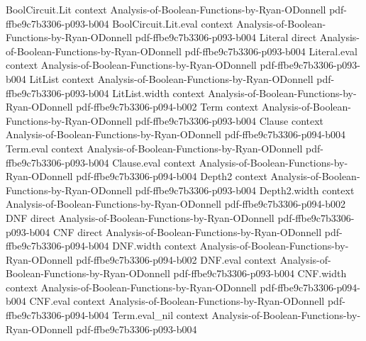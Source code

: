 \begin{theorem}
\leanok
{}
\proofstep
  {BoolCircuit.Lit}
  {context}
  {Analysis-of-Boolean-Functions-by-Ryan-ODonnell}
  {pdf-ffbe9c7b3306-p093-b004}
\proofstep
  {BoolCircuit.Lit.eval}
  {context}
  {Analysis-of-Boolean-Functions-by-Ryan-ODonnell}
  {pdf-ffbe9c7b3306-p093-b004}
\proofstep
  {Literal}
  {direct}
  {Analysis-of-Boolean-Functions-by-Ryan-ODonnell}
  {pdf-ffbe9c7b3306-p093-b004}
\proofstep
  {Literal.eval}
  {context}
  {Analysis-of-Boolean-Functions-by-Ryan-ODonnell}
  {pdf-ffbe9c7b3306-p093-b004}
\proofstep
  {LitList}
  {context}
  {Analysis-of-Boolean-Functions-by-Ryan-ODonnell}
  {pdf-ffbe9c7b3306-p093-b004}
\proofstep
  {LitList.width}
  {context}
  {Analysis-of-Boolean-Functions-by-Ryan-ODonnell}
  {pdf-ffbe9c7b3306-p094-b002}
\proofstep
  {Term}
  {context}
  {Analysis-of-Boolean-Functions-by-Ryan-ODonnell}
  {pdf-ffbe9c7b3306-p093-b004}
\proofstep
  {Clause}
  {context}
  {Analysis-of-Boolean-Functions-by-Ryan-ODonnell}
  {pdf-ffbe9c7b3306-p094-b004}
\proofstep
  {Term.eval}
  {context}
  {Analysis-of-Boolean-Functions-by-Ryan-ODonnell}
  {pdf-ffbe9c7b3306-p093-b004}
\proofstep
  {Clause.eval}
  {context}
  {Analysis-of-Boolean-Functions-by-Ryan-ODonnell}
  {pdf-ffbe9c7b3306-p094-b004}
\proofstep
  {Depth2}
  {context}
  {Analysis-of-Boolean-Functions-by-Ryan-ODonnell}
  {pdf-ffbe9c7b3306-p093-b004}
\proofstep
  {Depth2.width}
  {context}
  {Analysis-of-Boolean-Functions-by-Ryan-ODonnell}
  {pdf-ffbe9c7b3306-p094-b002}
\proofstep
  {DNF}
  {direct}
  {Analysis-of-Boolean-Functions-by-Ryan-ODonnell}
  {pdf-ffbe9c7b3306-p093-b004}
\proofstep
  {CNF}
  {direct}
  {Analysis-of-Boolean-Functions-by-Ryan-ODonnell}
  {pdf-ffbe9c7b3306-p094-b004}
\proofstep
  {DNF.width}
  {context}
  {Analysis-of-Boolean-Functions-by-Ryan-ODonnell}
  {pdf-ffbe9c7b3306-p094-b002}
\proofstep
  {DNF.eval}
  {context}
  {Analysis-of-Boolean-Functions-by-Ryan-ODonnell}
  {pdf-ffbe9c7b3306-p093-b004}
\proofstep
  {CNF.width}
  {context}
  {Analysis-of-Boolean-Functions-by-Ryan-ODonnell}
  {pdf-ffbe9c7b3306-p094-b004}
\proofstep
  {CNF.eval}
  {context}
  {Analysis-of-Boolean-Functions-by-Ryan-ODonnell}
  {pdf-ffbe9c7b3306-p094-b004}
\proofstep
  {Term.eval_nil}
  {context}
  {Analysis-of-Boolean-Functions-by-Ryan-ODonnell}
  {pdf-ffbe9c7b3306-p093-b004}

\end{theorem}
